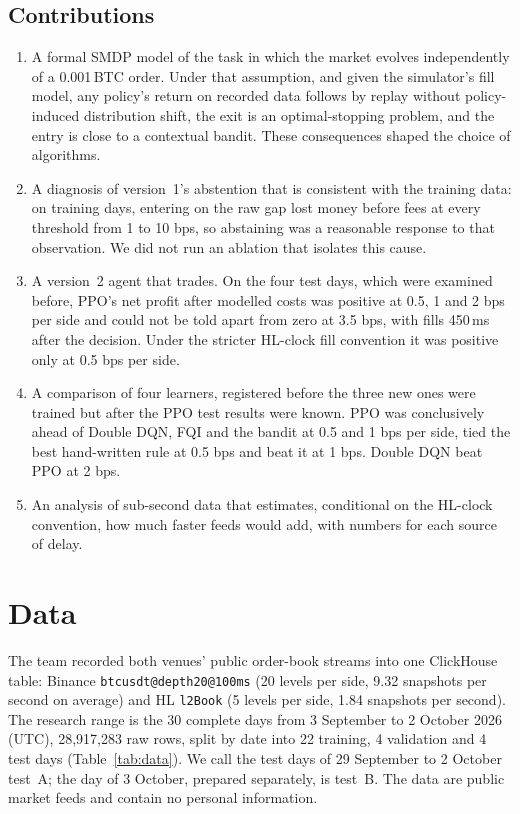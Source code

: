 \documentclass[12pt,a4paper]{article}
\DeclareRobustCommand{\bps}{\ifmmode\,\text{bps}\else\,bps\fi}
\begin{document}
\subsection{Contributions}
\begin{enumerate}
\item A formal SMDP model of the task in which the market evolves independently of a
0.001\,BTC order. Under that assumption, and given the simulator's fill model, any policy's
return on recorded data follows by replay without policy-induced distribution shift, the exit
is an optimal-stopping problem, and the entry is close to a contextual bandit. These
consequences shaped the choice of algorithms.
\item A diagnosis of version~1's abstention that is consistent with the training data: on
training days, entering on the raw gap lost money before fees at every threshold from 1 to
10\bps, so abstaining was a reasonable response to that observation. We did not run an
ablation that isolates this cause.
\item A version~2 agent that trades. On the four test days, which were examined before, PPO's
net profit after modelled costs was positive at 0.5, 1 and 2\bps{} per side and could not be
told apart from zero at 3.5\bps, with fills 450\,ms after the decision. Under the stricter
HL-clock fill convention it was positive only at 0.5\bps{} per side.
\item A comparison of four learners, registered before the three new ones were trained but
after the PPO test results were known. PPO was conclusively ahead of Double
DQN, FQI and the bandit at 0.5 and 1\bps{} per side, tied the best hand-written rule
at 0.5\bps{} and beat it at 1\bps. Double DQN beat PPO at 2\bps.
\item An analysis of sub-second data that estimates, conditional on the HL-clock convention,
how much faster feeds would add, with numbers for each source of delay.
\end{enumerate}

\section{Data}\label{sec:data}
The team recorded both venues' public order-book streams into one ClickHouse table: Binance
\texttt{btcusdt@depth20@100ms} (20 levels per side, 9.32 snapshots per second on average) and
HL \texttt{l2Book} (5 levels per side, 1.84 snapshots per second). The research range is the
30 complete days from 3 September to 2 October 2026 (UTC), 28,917,283 raw rows,
split by date into 22 training, 4 validation and 4 test days (Table~\ref{tab:data}). We call
the test days of 29 September to 2 October test~A; the day of 3 October, prepared separately,
is test~B. The data are public market feeds and contain no personal information.
\end{document}
